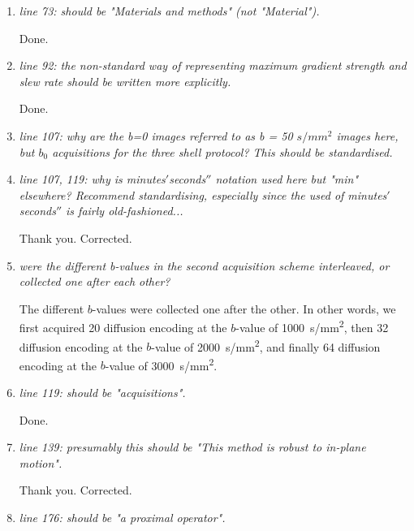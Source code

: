 \documentclass[a4paper,11pt,twoside]{report}
\begin{document}
\begin{enumerate}[resume]
    \item \textit{line 73: should be "Materials and methods" (not "Material").}

    \hspace{1em} Done.

    \item \textit{line 92: the non-standard way of representing maximum gradient strength and slew rate should be written more explicitly.}

    \hspace{1em} Done.

    \item \textit{line 107: why are the b=0 images referred to as b = 50 $s/mm^2$ images here, but $b_0$ acquisitions for the three shell protocol? This should be standardised.}


    \item \textit{line 107, 119: why is minutes$'$seconds$''$ notation used here but "min" elsewhere? Recommend standardising, especially since the used of minutes$'$seconds$''$ is fairly old-fashioned...}

    \hspace{1em} Thank you. Corrected.

    \item \textit{were the different b-values in the second acquisition scheme interleaved, or collected one after each other?}

    \hspace{1em}
    The different $b$-values were collected one after the other.
    In other words, we first acquired 20 diffusion encoding at the $b$-value of \SI{1000}{s/mm^2},
    then 32 diffusion encoding at the $b$-value of \SI{2000}{s/mm^2},
    and finally 64 diffusion encoding at the $b$-value of \SI{3000}{s/mm^2}.

    \item \textit{line 119: should be "acquisitions".}

    \hspace{1em} Done.

    \item \textit{line 139: presumably this should be "This method is robust to in-plane motion".}

    \hspace{1em} Thank you. Corrected.

    \item \textit{line 176: should be "a proximal operator".}


\end{enumerate}
\end{document}
